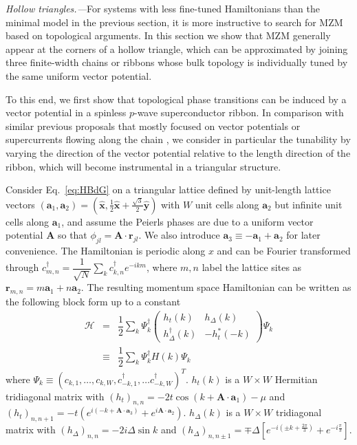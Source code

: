 \documentclass[aps,prb,twocolumn,showpacs,amsmath,amssymb,superscriptaddress]{revtex4-2}
\let\oldhat\hat
\renewcommand{\hat}[1]{\oldhat{\mathbf{#1}}}
\newcommand{\ham}{\mathcal{H}}
\newcommand{\cc}{c^{\dagger}}
\newcommand{\de}{\Delta}
\begin{document}
\emph{Hollow triangles.---}For systems with less fine-tuned Hamiltonians than the minimal model in the previous section, it is more instructive to search for MZM based on topological arguments. In this section we show that MZM generally appear at the corners of a hollow triangle, which can be approximated by joining three finite-width chains or ribbons whose bulk topology is individually tuned by the same uniform vector potential.

To this end, we first show that topological phase transitions can be induced by a vector potential in a spinless $p$-wave superconductor ribbon. In comparison with similar previous proposals that mostly focused on vector potentials or supercurrents flowing along the chain \cite{romitoManipulatingMajoranaFermions2012, takasanSupercurrentinducedTopologicalPhase2022}, we consider in particular the tunability by varying the direction of the vector potential relative to the length direction of the ribbon, which will become instrumental in a triangular structure.

Consider Eq.~\eqref{eq:HBdG} on a triangular lattice defined by unit-length lattice vectors $(\mathbf a_1, \mathbf a_2) = (\hat{x}, \frac{1}{2}\hat{x} + \frac{\sqrt{3}}{2}\hat{y})$ with $W$ unit cells along $\mathbf a_2$ but infinite unit cells along $\mathbf a_1$, and assume the Peierls phases are due to a uniform vector potential $\mathbf A$ so that $\phi_{jl} = \mathbf A\cdot \mathbf r_{jl}$. We also introduce $\mathbf a_3 \equiv -\mathbf a_1 + \mathbf a_2$ for later convenience. The Hamiltonian is periodic along $x$ and can be Fourier transformed through $\cc_{m,n} = \dfrac{1}{\sqrt{N}} \sum_{k} \cc_{k,n} e^{-i km}$, where $m,n$ label the lattice sites as $\mathbf r_{m,n} = m\mathbf a_1 + n \mathbf a_2$. The resulting momentum space Hamiltonian can be written as the following block form up to a constant
\begin{eqnarray}\label{eq:Hribbon}
      \ham &=& \dfrac{1}{2} \sum_k \Psi_k^\dagger \left(
    \begin{matrix}
      h_t(k) & h_\Delta(k) \\
      h_\Delta^\dagger(k) & -h_t^*(-k)
    \end{matrix} \right)
    \Psi_k \\\nonumber
&\equiv&\dfrac{1}{2} \sum_k \Psi_k^\dagger H(k)
    \Psi_k
\end{eqnarray}
where $\Psi_k \equiv (c_{k,1},\dots, c_{k,W},c^\dag_{-k,1},\dots c_{-k,W}^\dag)^T$. $h_t(k)$ is a $W\times W$ Hermitian tridiagonal matrix with $(h_t)_{n,n} = -2t\cos(k+\mathbf A\cdot \mathbf a_1) - \mu$ and $(h_t)_{n,n+1} = -t\left( e^{i(-k+\mathbf A\cdot \mathbf a_3)}  + e^{i\mathbf A \cdot \mathbf a_2}\right)$. $h_\Delta(k)$ is a $W\times W$ tridiagonal matrix with $(h_\Delta)_{n,n} = -2i\de \sin k $ and $(h_\Delta)_{n,n\pm 1} = \mp \de\left[ e^{-i(\pm k + \frac{2\pi}{3})} + e^{-i\frac{\pi}{3}} \right]$.
\end{document}
